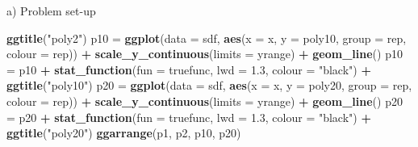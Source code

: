 \documentclass[ignorenonframetext,]{beamer}
\newenvironment{Shaded}{\begin{snugshade}}{\end{snugshade}}
\newcommand{\KeywordTok}[1]{\textcolor[rgb]{0.13,0.29,0.53}{\textbf{#1}}}
\newcommand{\DataTypeTok}[1]{\textcolor[rgb]{0.13,0.29,0.53}{#1}}
\newcommand{\FloatTok}[1]{\textcolor[rgb]{0.00,0.00,0.81}{#1}}
\newcommand{\StringTok}[1]{\textcolor[rgb]{0.31,0.60,0.02}{#1}}
\newcommand{\OperatorTok}[1]{\textcolor[rgb]{0.81,0.36,0.00}{\textbf{#1}}}
\newcommand{\NormalTok}[1]{#1}
\begin{document}
\begin{frame}[fragile]
\begin{block}{a) Problem set-up}
\begin{Shaded}
\begin{Highlighting}[]
\StringTok{    }\KeywordTok{ggtitle}\NormalTok{(}\StringTok{"poly2"}\NormalTok{)}
\NormalTok{p10 =}\StringTok{ }\KeywordTok{ggplot}\NormalTok{(}\DataTypeTok{data =}\NormalTok{ sdf, }\KeywordTok{aes}\NormalTok{(}\DataTypeTok{x =}\NormalTok{ x, }\DataTypeTok{y =}\NormalTok{ poly10, }\DataTypeTok{group =}\NormalTok{ rep, }\DataTypeTok{colour =}\NormalTok{ rep)) }\OperatorTok{+}\StringTok{ }
\StringTok{    }\KeywordTok{scale_y_continuous}\NormalTok{(}\DataTypeTok{limits =}\NormalTok{ yrange) }\OperatorTok{+}\StringTok{ }\KeywordTok{geom_line}\NormalTok{()}
\NormalTok{p10 =}\StringTok{ }\NormalTok{p10 }\OperatorTok{+}\StringTok{ }\KeywordTok{stat_function}\NormalTok{(}\DataTypeTok{fun =}\NormalTok{ truefunc, }\DataTypeTok{lwd =} \FloatTok{1.3}\NormalTok{, }\DataTypeTok{colour =} \StringTok{"black"}\NormalTok{) }\OperatorTok{+}\StringTok{ }
\StringTok{    }\KeywordTok{ggtitle}\NormalTok{(}\StringTok{"poly10"}\NormalTok{)}
\NormalTok{p20 =}\StringTok{ }\KeywordTok{ggplot}\NormalTok{(}\DataTypeTok{data =}\NormalTok{ sdf, }\KeywordTok{aes}\NormalTok{(}\DataTypeTok{x =}\NormalTok{ x, }\DataTypeTok{y =}\NormalTok{ poly20, }\DataTypeTok{group =}\NormalTok{ rep, }\DataTypeTok{colour =}\NormalTok{ rep)) }\OperatorTok{+}\StringTok{ }
\StringTok{    }\KeywordTok{scale_y_continuous}\NormalTok{(}\DataTypeTok{limits =}\NormalTok{ yrange) }\OperatorTok{+}\StringTok{ }\KeywordTok{geom_line}\NormalTok{()}
\NormalTok{p20 =}\StringTok{ }\NormalTok{p20 }\OperatorTok{+}\StringTok{ }\KeywordTok{stat_function}\NormalTok{(}\DataTypeTok{fun =}\NormalTok{ truefunc, }\DataTypeTok{lwd =} \FloatTok{1.3}\NormalTok{, }\DataTypeTok{colour =} \StringTok{"black"}\NormalTok{) }\OperatorTok{+}\StringTok{ }
\StringTok{    }\KeywordTok{ggtitle}\NormalTok{(}\StringTok{"poly20"}\NormalTok{)}
\KeywordTok{ggarrange}\NormalTok{(p1, p2, p10, p20)}
\end{Highlighting}
\end{Shaded}

\end{block}

\end{frame}
\end{document}
